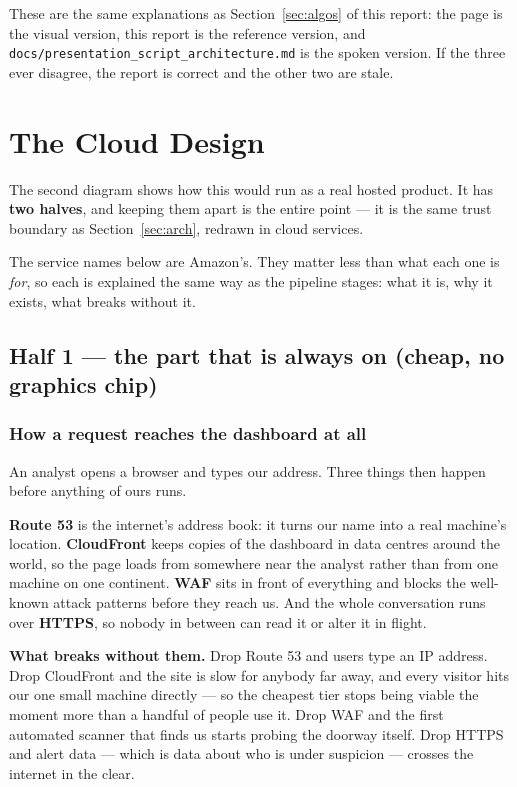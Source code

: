 \documentclass[11pt,a4paper]{article}
\newcommand{\code}[1]{\texttt{\small #1}}
\begin{document}
These are the same explanations as Section~\ref{sec:algos} of this report: the
page is the visual version, this report is the reference version, and
\code{docs/presentation\_script\_architecture.md} is the spoken version. If the
three ever disagree, the report is correct and the other two are stale.

\section{The Cloud Design}
\label{sec:cloud}

The second diagram shows how this would run as a real hosted product. It has
\textbf{two halves}, and keeping them apart is the entire point --- it is the
same trust boundary as Section~\ref{sec:arch}, redrawn in cloud services.

The service names below are Amazon's. They matter less than what each one is
\emph{for}, so each is explained the same way as the pipeline stages: what it
is, why it exists, what breaks without it.

\subsection{Half 1 --- the part that is always on (cheap, no graphics chip)}

\subsubsection*{How a request reaches the dashboard at all}

An analyst opens a browser and types our address. Three things then happen
before anything of ours runs.

\textbf{Route 53} is the internet's address book: it turns our name into a real
machine's location. \textbf{CloudFront} keeps copies of the dashboard in data
centres around the world, so the page loads from somewhere near the analyst
rather than from one machine on one continent. \textbf{WAF} sits in front of
everything and blocks the well-known attack patterns before they reach us. And
the whole conversation runs over \textbf{HTTPS}, so nobody in between can read
it or alter it in flight.

\textbf{What breaks without them.} Drop Route 53 and users type an IP address.
Drop CloudFront and the site is slow for anybody far away, and every visitor
hits our one small machine directly --- so the cheapest tier stops being viable
the moment more than a handful of people use it. Drop WAF and the first
automated scanner that finds us starts probing the doorway itself. Drop HTTPS
and alert data --- which is data about who is under suspicion --- crosses the
internet in the clear.
\end{document}
